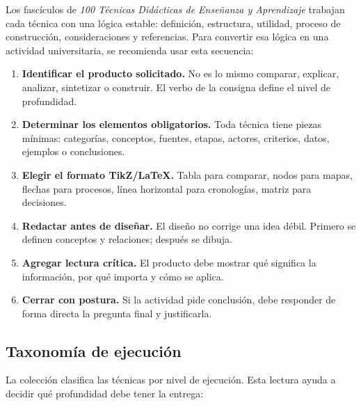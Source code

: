 Los fascículos de \textit{100 Técnicas Didácticas de Enseñanza y Aprendizaje} trabajan cada técnica con una lógica estable: definición, estructura, utilidad, proceso de construcción, consideraciones y referencias. Para convertir esa lógica en una actividad universitaria, se recomienda usar esta secuencia:

\begin{enumerate}
	\item \textbf{Identificar el producto solicitado.} No es lo mismo comparar, explicar, analizar, sintetizar o construir. El verbo de la consigna define el nivel de profundidad.
	\item \textbf{Determinar los elementos obligatorios.} Toda técnica tiene piezas mínimas: categorías, conceptos, fuentes, etapas, actores, criterios, datos, ejemplos o conclusiones.
	\item \textbf{Elegir el formato TikZ/LaTeX.} Tabla para comparar, nodos para mapas, flechas para procesos, línea horizontal para cronologías, matriz para decisiones.
	\item \textbf{Redactar antes de diseñar.} El diseño no corrige una idea débil. Primero se definen conceptos y relaciones; después se dibuja.
	\item \textbf{Agregar lectura crítica.} El producto debe mostrar qué significa la información, por qué importa y cómo se aplica.
	\item \textbf{Cerrar con postura.} Si la actividad pide conclusión, debe responder de forma directa la pregunta final y justificarla.
\end{enumerate}

\subsection{Taxonomía de ejecución}

La colección clasifica las técnicas por nivel de ejecución. Esta lectura ayuda a decidir qué profundidad debe tener la entrega:

